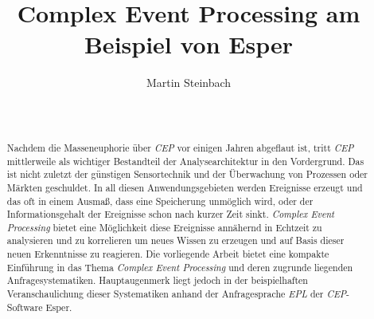 \documentclass{acm_proc_article-sp}
\begin{document}
\title{Complex Event Processing am Beispiel von Esper}
\author{
\alignauthor
Martin Steinbach\vspace{0.1cm}\\
       \\
       \\
       }




\maketitle

\begin{abstract}
\vspace{0.1cm}
Nachdem die Masseneuphorie über \textit{CEP} vor einigen Jahren abgeflaut ist, tritt 
\textit{CEP} mittlerweile als wichtiger Bestandteil der Analysearchitektur in den 
Vordergrund. Das ist nicht 
zuletzt der günstigen Sensortechnik und der Überwachung von Prozessen oder Märkten 
geschuldet. In all diesen Anwendungsgebieten werden Ereignisse erzeugt und das oft in 
einem Ausmaß, dass eine Speicherung unmöglich wird, oder der Informationsgehalt der 
Ereignisse schon nach kurzer Zeit sinkt. \textit{Complex Event Processing} bietet eine 
Möglichkeit diese Ereignisse annähernd in Echtzeit zu analysieren und zu korrelieren um 
neues Wissen zu erzeugen und auf Basis dieser neuen Erkenntnisse zu reagieren. Die 
vorliegende Arbeit bietet eine kompakte Einführung in das Thema \textit{Complex Event 
Processing} und deren zugrunde liegenden Anfragesystematiken. Hauptaugenmerk liegt jedoch 
in der beispielhaften Veranschaulichung dieser Systematiken anhand der Anfragesprache 
\textit{EPL} der \textit{CEP}-Software Esper.

\end{abstract}


\end{document}
